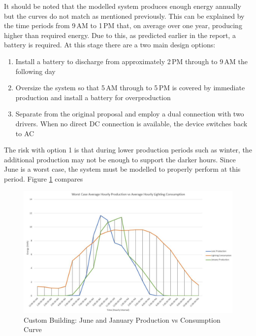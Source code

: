 It should be noted that the modelled system produces enough energy annually but the curves do not match as mentioned previously. This can be explained by the time periods from 9\,AM to 1\,PM that, on average over one year, producing higher than required energy. Due to this, as predicted earlier in the report, a battery is required. At this stage there are a two main design options:

\begin{enumerate} [noitemsep]
	\item Install a battery to discharge from approximately 2\,PM through to 9\,AM the following day
	\item Oversize the system so that 5\,AM through to 5\,PM is covered by immediate production and install a battery for overproduction
	\item Separate from the original proposal and employ a dual connection with two drivers. When no direct DC connection is available, the device switches back to AC 
\end{enumerate} 

The risk with option 1 is that during lower production periods such as winter, the additional production may not be enough to support the darker hours. Since June is a worst case, the system must be modelled to properly perform at this period. Figure \ref{fig:custom-building-production-vs-consumption-best-vs-worst} compares    

\begin{figure}[H]
	\hfill\includegraphics[width = 150mm]{images/custom-building/production-vs-consumption-worst-vs-best-case}\hspace*{\fill}
	\caption{Custom Building: June and January Production vs Consumption Curve} 
	\label{fig:custom-building-production-vs-consumption-best-vs-worst}
\end{figure}  

